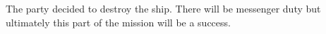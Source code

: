 The party decided to destroy the ship.
There will be messenger duty but ultimately this part of the mission will be a success.
